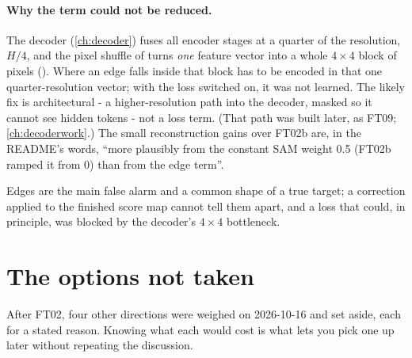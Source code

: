 \paragraph{Why the term could not be reduced.} 
The decoder (\cref{ch:decoder}) fuses all encoder stages at a quarter of the resolution, $H/4$, and the pixel shuffle
of \citet{shi2016realtime} turns \emph{one} feature vector into a whole $4 \times 4$ block of pixels
(). Where an edge falls inside that block has to be
encoded in that one quarter-resolution vector; with the loss switched on, it was not learned. The likely fix is
architectural - a higher-resolution path into the decoder, masked so it cannot see hidden tokens - not a loss term.
(That path was built later, as FT09; \cref{ch:decoderwork}.) The small reconstruction gains over FT02b are, in the
README's words, ``more plausibly from the constant SAM weight 0.5 (FT02b ramped it from 0) than from the edge term''.

\begin{keypoint}
Edges are the main false alarm and a common shape of a true target; a correction applied to the finished score map
cannot tell them apart, and a loss that could, in principle, was blocked by the decoder's $4 \times 4$ bottleneck.
\end{keypoint}

\section{The options not taken}\label{sec:ftruns:options}

After FT02, four other directions were weighed on 2026-10-16 and set aside, each for a stated reason. Knowing what
each would cost is what lets you pick one up later without repeating the discussion.



